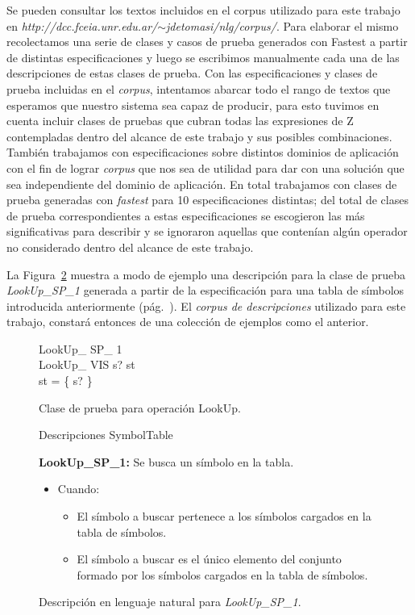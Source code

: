 Se pueden consultar los textos incluidos en el corpus utilizado para este trabajo en \emph{http://dcc.fceia.unr.edu.ar/$\sim$jdetomasi/nlg/corpus/}. Para elaborar el mismo recolectamos una serie de clases y casos de prueba generados con Fastest a partir de distintas especificaciones y luego se escribimos manualmente cada una de las descripciones de  estas clases de prueba. Con las especificaciones y clases de prueba incluidas en el \emph{corpus}, intentamos abarcar todo el rango de textos que esperamos que nuestro sistema sea capaz de producir, para esto tuvimos en cuenta incluir clases de pruebas que cubran todas las expresiones de Z contempladas dentro del alcance de este trabajo y sus posibles combinaciones. También trabajamos con especificaciones sobre distintos dominios de aplicación con el fin de lograr \emph{corpus} que nos sea de utilidad para dar con una solución que sea independiente del dominio de aplicación. En total trabajamos con clases de prueba generadas con \emph{fastest} para 10 especificaciones distintas; del total de clases de prueba correspondientes a estas especificaciones se escogieron las más significativas para describir y se ignoraron aquellas que contenían algún operador no considerado dentro del alcance de este trabajo.

La Figura~\ref{fig:ej_desc_lookup_sp_1} muestra a modo de ejemplo una descripción para la clase de prueba \emph{LookUp\_SP\_1} generada a partir de la especificación para una tabla de símbolos introducida anteriormente (pág.~\pageref{fig:spec_symbol_table}). 
El \emph{corpus de descripciones} utilizado para este trabajo, constará entonces de una colección de ejemplos como el anterior.


\begin{figure}[H]
  \centering
   \begin{schema}{LookUp\_ SP\_ 1}\\
  		LookUp\_ VIS 
  		\where
  	 	s? \in \dom st \\
 		\dom st = \{ s? \}
  	\end{schema}
  \caption{Clase de prueba para operación LookUp.}
  \label{fig:ej_lookup_sp_1}
\end{figure}

\begin{figure}[H]
Descripciones SymbolTable 

\bigskip
\textbf{LookUp\_SP\_1:} Se busca un símbolo en la tabla.  
  \begin{itemize}
   \item{Cuando:}
   \begin{itemize}
  	  \item{El símbolo a buscar pertenece a los símbolos cargados en la tabla de símbolos.}
  	  \item{El símbolo a buscar es el único elemento del conjunto formado por los símbolos cargados en la tabla de símbolos.}   
   \end{itemize}
  \end{itemize}
  \caption{Descripción en lenguaje natural para \emph{LookUp\_SP\_1}.}
  \label{fig:ej_desc_lookup_sp_1}
\end{figure}

